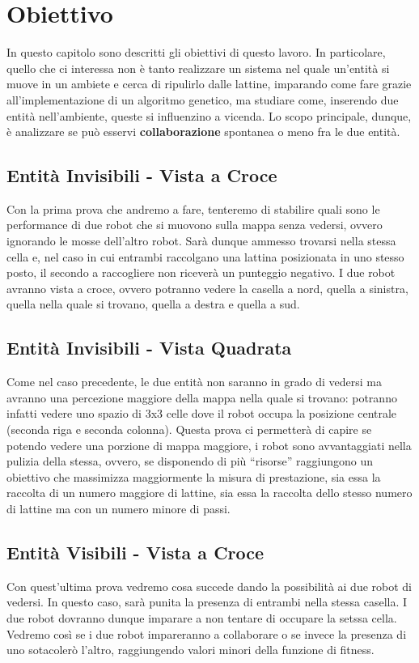 \chapter{Obiettivo}
In questo capitolo sono descritti gli obiettivi di questo lavoro. In
particolare, quello che ci interessa non è tanto realizzare un sistema nel quale
un'entità si muove in un ambiete e cerca di ripulirlo dalle lattine, imparando
come fare grazie all'implementazione di un algoritmo genetico, ma studiare come,
inserendo due entità nell'ambiente, queste si influenzino a vicenda. Lo scopo
principale, dunque, è analizzare se può esservi \textbf{collaborazione}
spontanea o meno fra le due entità.

\section{Entità Invisibili - Vista a Croce}
Con la prima prova che andremo a fare, tenteremo di stabilire quali sono le
performance di due robot che si muovono sulla mappa senza vedersi, ovvero
ignorando le mosse dell'altro robot. Sarà dunque ammesso trovarsi nella stessa
cella e, nel caso in cui entrambi raccolgano una lattina posizionata in uno
stesso posto, il secondo a raccogliere non riceverà un punteggio
negativo.\newline
I due robot avranno vista a croce, ovvero potranno vedere la casella a nord,
quella a sinistra, quella nella quale si trovano, quella a destra e quella a
sud.

\section{Entità Invisibili - Vista Quadrata}
Come nel caso precedente, le due entità non saranno in grado di vedersi ma
avranno una percezione maggiore della mappa nella quale si trovano: potranno
infatti vedere uno spazio di 3x3 celle dove il robot occupa la posizione
centrale (seconda riga e seconda colonna).\newline
Questa prova ci permetterà di capire se potendo vedere una porzione di mappa
maggiore, i robot sono avvantaggiati nella pulizia della stessa, ovvero, se
disponendo di più ``risorse'' raggiungono un obiettivo che massimizza
maggiormente la misura di prestazione, sia essa la raccolta di un numero
maggiore di lattine, sia essa la raccolta dello stesso numero di lattine ma con
un numero minore di passi.

\section{Entità Visibili - Vista a Croce}
Con quest'ultima prova vedremo cosa succede dando la possibilità ai due robot
di vedersi. In questo caso, sarà punita la presenza di entrambi nella stessa
casella. I due robot dovranno dunque imparare a non tentare di occupare la
setssa cella.\newline
Vedremo così se i due robot impareranno a collaborare o se invece la presenza
di uno sotacolerò l'altro, raggiungendo valori minori della funzione di fitness.
